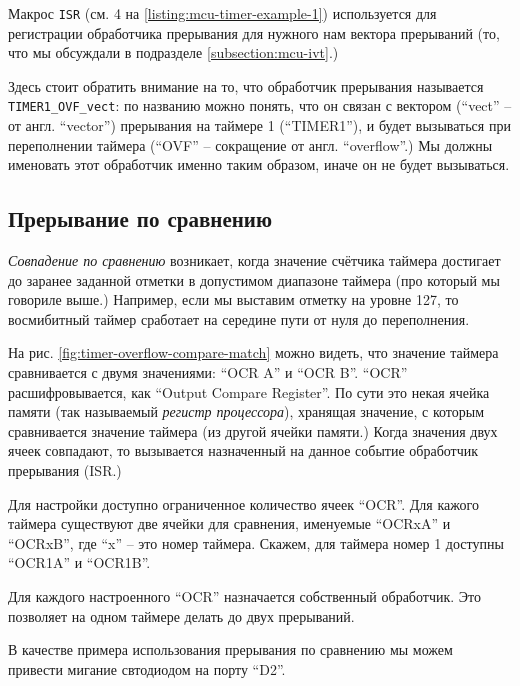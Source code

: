 \documentclass[../sparc.tex]{subfiles}
\begin{document}
Макрос \texttt{ISR} (см. 4 на \ref{listing:mcu-timer-example-1})
используется для регистрации обработчика прерывания для нужного нам вектора
прерываний (то, что мы обсуждали в подразделе \ref{subsection:mcu-ivt}.)

Здесь стоит обратить внимание на то, что обработчик прерывания называется
\texttt{TIMER1_OVF_vect}: по названию можно понять, что он связан с
вектором (``vect'' -- от англ. ``vector'') прерывания на таймере 1 (``TIMER1''),
и будет вызываться при переполнении таймера (``OVF'' -- сокращение от англ.
``overflow''.)  Мы должны именовать этот обработчик именно таким образом, иначе
он не будет вызываться.

\subsection{Прерывание по сравнению}


\emph{Совпадение по сравнению} возникает, когда значение счётчика таймера
достигает до заранее заданной отметки в допустимом диапазоне таймера (про
который мы говориле выше.)  Например, если мы выставим отметку на уровне 127, то
восмибитный таймер сработает на середине пути от нуля до переполнения.


На рис. \ref{fig:timer-overflow-compare-match} можно видеть, что значение
таймера сравнивается с двумя значениями: ``OCR A'' и ``OCR B''. ``OCR''
расшифровывается, как ``Output Compare Register''.  По сути это некая ячейка
памяти (так называемый \emph{регистр процессора}), хранящая значение, с которым
сравнивается значение таймера (из другой ячейки памяти.)  Когда значения двух
ячеек совпадают, то вызывается назначенный на данное событие обработчик
прерывания (\gls{ISR}.)

Для настройки доступно ограниченное количество ячеек ``OCR''.  Для кажого
таймера существуют две ячейки для сравнения, именуемые ``OCRxA'' и ``OCRxB'',
где ``x'' -- это номер таймера.  Скажем, для таймера номер 1 доступны ``OCR1A'' и
``OCR1B''.

Для каждого настроенного ``OCR'' назначается собственный обработчик.  Это
позволяет на одном таймере делать до двух прерываний.

В качестве примера использования прерывания по сравнению мы можем привести
мигание свтодиодом на порту ``D2''.
\end{document}
